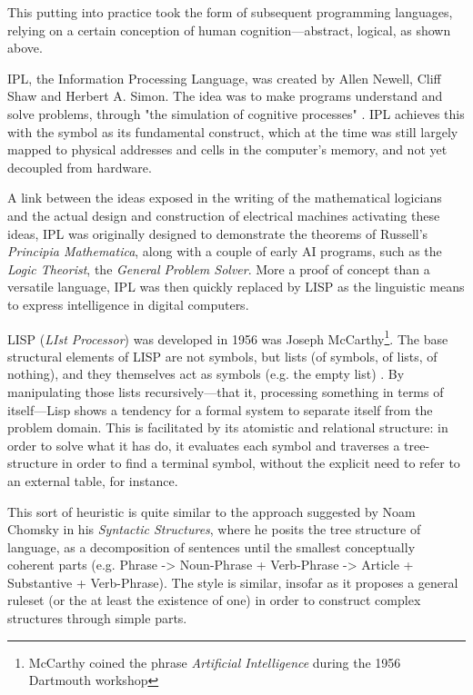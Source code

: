 This putting into practice took the form of subsequent programming languages, relying on a certain conception of human cognition—abstract, logical, as shown above.

IPL, the Information Processing Language, was created by Allen Newell, Cliff Shaw and Herbert A. Simon.  The idea was to make programs understand and solve problems, through "the simulation of cognitive processes" \citep{newell_information_1964}. IPL achieves this with the symbol as its fundamental construct, which at the time was still largely mapped to physical addresses and cells in the computer's memory, and not yet decoupled from hardware.

A link between the ideas exposed in the writing of the mathematical logicians and the actual design and construction of electrical machines activating these ideas, IPL was originally designed to demonstrate the theorems of Russell's \emph{Principia Mathematica}, along with a couple of early AI programs, such as the \emph{Logic Theorist}, the \emph{General Problem Solver}. More a proof of concept than a versatile language, IPL was then quickly replaced by LISP as the linguistic means to express intelligence in digital computers.

LISP (\emph{LIst Processor}) was developed in 1956 was Joseph McCarthy\footnote{McCarthy coined the phrase \emph{Artificial Intelligence} during the 1956 Dartmouth workshop}. The base structural elements of LISP are not symbols, but lists (of symbols, of lists, of nothing), and they themselves act as symbols (e.g. the empty list) \citep{mccarthy_history_1978}. By manipulating those lists recursively—that it, processing something in terms of itself—Lisp shows a tendency for a formal system to separate itself from the problem domain. This is facilitated by its atomistic and relational structure: in order to solve what it has do, it evaluates each symbol and traverses a tree-structure in order to find a terminal symbol, without the explicit need to refer to an external table, for instance.

This sort of heuristic is quite similar to the approach suggested by Noam Chomsky in his \emph{Syntactic Structures}, where he posits the tree structure of language, as a decomposition of sentences until the smallest conceptually coherent parts (e.g. Phrase -> Noun-Phrase + Verb-Phrase -> Article + Substantive + Verb-Phrase). The style is similar, insofar as it proposes a general ruleset (or the at least the existence of one) in order to construct complex structures through simple parts.

